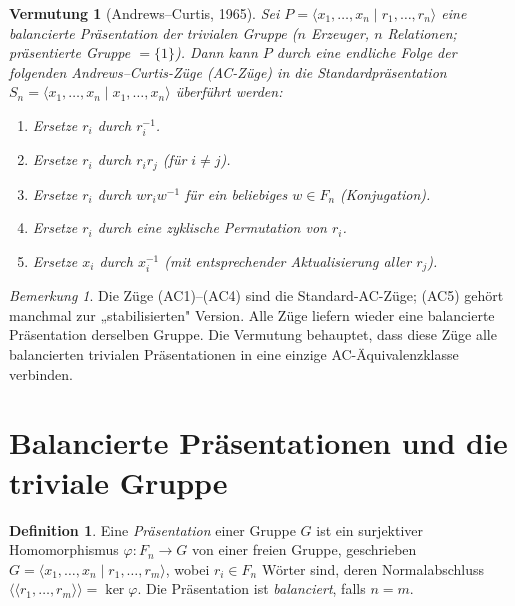\documentclass[12pt,a4paper]{amsart}
\newtheorem{vermutung}[theorem]{Vermutung}
\theoremstyle{definition}
\newtheorem{definition_de}[theorem]{Definition}
\theoremstyle{remark}
\newtheorem{bemerkung}[theorem]{Bemerkung}
\begin{document}
\begin{vermutung}[Andrews--Curtis, 1965]\label{verm:AC}
Sei $P = \langle x_1,\ldots,x_n \mid r_1,\ldots,r_n \rangle$ eine balancierte
Präsentation der trivialen Gruppe ($n$ Erzeuger, $n$ Relationen; präsentierte Gruppe
$= \{1\}$). Dann kann $P$ durch eine endliche Folge der folgenden
\emph{Andrews--Curtis-Züge} (AC-Züge) in die Standardpräsentation
$S_n = \langle x_1,\ldots,x_n \mid x_1,\ldots,x_n \rangle$ überführt werden:
\begin{enumerate}[label=(AC\arabic*)]
  \item Ersetze $r_i$ durch $r_i^{-1}$.
  \item Ersetze $r_i$ durch $r_i r_j$ (für $i \neq j$).
  \item Ersetze $r_i$ durch $w r_i w^{-1}$ für ein beliebiges $w \in F_n$ (Konjugation).
  \item Ersetze $r_i$ durch eine zyklische Permutation von $r_i$.
  \item Ersetze $x_i$ durch $x_i^{-1}$ (mit entsprechender Aktualisierung aller $r_j$).
\end{enumerate}
\end{vermutung}

\begin{bemerkung}
Die Züge (AC1)--(AC4) sind die Standard-AC-Züge; (AC5) gehört manchmal zur
„stabilisierten" Version. Alle Züge liefern wieder eine balancierte Präsentation
derselben Gruppe. Die Vermutung behauptet, dass diese Züge alle balancierten
trivialen Präsentationen in eine einzige AC-Äquivalenzklasse verbinden.
\end{bemerkung}

\section{Balancierte Präsentationen und die triviale Gruppe}

\begin{definition_de}
Eine \emph{Präsentation} einer Gruppe $G$ ist ein surjektiver Homomorphismus
$\varphi \colon F_n \to G$ von einer freien Gruppe, geschrieben
$G = \langle x_1,\ldots,x_n \mid r_1,\ldots,r_m \rangle$, wobei $r_i \in F_n$
Wörter sind, deren Normalabschluss $\langle\!\langle r_1,\ldots,r_m \rangle\!\rangle
= \ker\varphi$. Die Präsentation ist \emph{balanciert}, falls $n = m$.
\end{definition_de}
\end{document}
